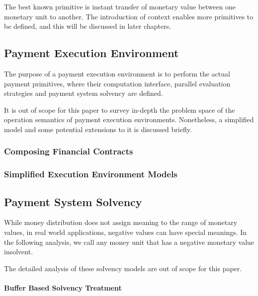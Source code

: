 The best known primitive is instant transfer of monetary value between one monetary unit to
another. The introduction of context enables more primitives to be defined, and this will be
discussed in later chapters.

\subsection{Payment Execution Environment}

The purpose of a payment execution environment is to perform the actual payment primitives, where
their computation interface, parallel evaluation strategies and payment system solvency are defined.

It is out of scope for this paper to survey in-depth the problem space of the operation semantics of
payment execution environments. Nonetheless, a simplified model and some potential extensions to it
is discussed briefly.

\subsubsection{Composing Financial Contracts}



\subsubsection{Simplified Execution Environment Models}



\subsection{Payment System Solvency}

While money distribution does not assign meaning to the range of monetary values, in real world
applications, negative values can have special meanings. In the following analysis, we call any
money unit that has a negative monetary value insolvent.

The detailed analysis of these solvency models are out of scope for this paper.

\paragraph{Buffer Based Solvency Treatment}

